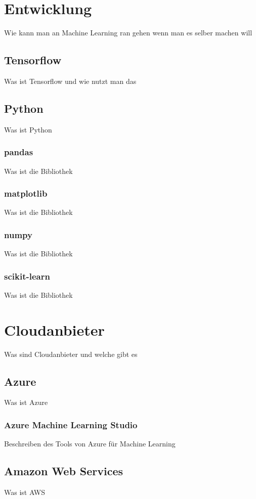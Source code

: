 \section{Entwicklung}
Wie kann man an Machine Learning ran gehen wenn man es selber machen will

\subsection{Tensorflow}
Was ist Tensorflow und wie nutzt man das

\subsection{Python}
Was ist Python

\subsubsection{pandas}
Was ist die Bibliothek

\subsubsection{matplotlib}
Was ist die Bibliothek

\subsubsection{numpy}
Was ist die Bibliothek

\subsubsection{scikit-learn}
Was ist die Bibliothek

\section{Cloudanbieter}
Was sind Cloudanbieter und welche gibt es

\subsection{Azure}
Was ist Azure

\subsubsection{Azure Machine Learning Studio}
Beschreiben des Tools von Azure für Machine Learning

\subsection{Amazon Web Services}
Was ist AWS

